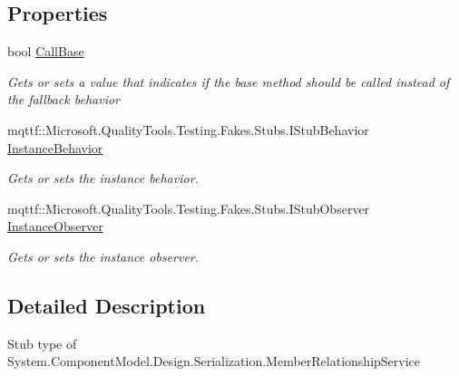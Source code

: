 \subsection*{Properties}
\begin{DoxyCompactItemize}
\item 
bool \hyperlink{class_system_1_1_component_model_1_1_design_1_1_serialization_1_1_fakes_1_1_stub_member_relationship_service_adcc72494df9bc5142cecfdbc6717a9c4}{Call\-Base}
\begin{DoxyCompactList}\small\item\em Gets or sets a value that indicates if the base method should be called instead of the fallback behavior\end{DoxyCompactList}\item 
mqttf\-::\-Microsoft.\-Quality\-Tools.\-Testing.\-Fakes.\-Stubs.\-I\-Stub\-Behavior \hyperlink{class_system_1_1_component_model_1_1_design_1_1_serialization_1_1_fakes_1_1_stub_member_relationship_service_a1840a5902efd86b8e2a588077060e569}{Instance\-Behavior}
\begin{DoxyCompactList}\small\item\em Gets or sets the instance behavior.\end{DoxyCompactList}\item 
mqttf\-::\-Microsoft.\-Quality\-Tools.\-Testing.\-Fakes.\-Stubs.\-I\-Stub\-Observer \hyperlink{class_system_1_1_component_model_1_1_design_1_1_serialization_1_1_fakes_1_1_stub_member_relationship_service_a939f93aadef9abc0e2a4233174014145}{Instance\-Observer}
\begin{DoxyCompactList}\small\item\em Gets or sets the instance observer.\end{DoxyCompactList}\end{DoxyCompactItemize}


\subsection{Detailed Description}
Stub type of System.\-Component\-Model.\-Design.\-Serialization.\-Member\-Relationship\-Service



